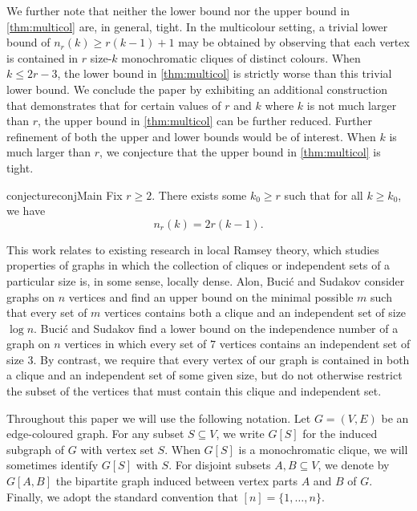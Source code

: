 \documentclass[12pt,a4paper]{article}
\begin{document}
We further note that neither the lower bound nor the upper bound in \cref{thm:multicol} are, in general, tight. In the multicolour setting, a trivial lower bound of $n_r(k) \geq r(k-1)+1$ may be obtained by observing that each vertex is contained in $r$ size-$k$ monochromatic cliques of distinct colours. When $k \leq 2r-3$, the lower bound in \cref{thm:multicol} is strictly worse than this trivial lower bound. We conclude the paper by exhibiting an additional construction that demonstrates that for certain values of $r$ and $k$ where $k$ is not much larger than $r$, the upper bound in \cref{thm:multicol} can be further reduced. Further refinement of both the upper and lower bounds would be of interest. When $k$ is much larger than $r$, we conjecture that the upper bound in \cref{thm:multicol} is tight.

\begin{restatable}{conjecture}{conjMain} \label{conj:main}
    Fix $r \geq 2$. There exists some $k_0 \geq r$ such that for all $k \geq k_0$, we have \begin{equation*}
        n_r(k) = 2r(k-1).
    \end{equation*}
\end{restatable}

This work relates to existing research in local Ramsey theory, which studies properties of graphs in which the collection of cliques or independent sets of a particular size is, in some sense, locally dense. Alon, Buci{\'c} and Sudakov \cite{alon2021large} consider graphs on $n$ vertices and find an upper bound on the minimal possible $m$ such that every set of $m$ vertices contains both a clique and an independent set of size $\log n$. Buci{\'c} and Sudakov \cite{bucic2023large} find a lower bound on the independence number of a graph on $n$ vertices in which every set of $7$ vertices contains an independent set of size $3$. By contrast, we require that every vertex of our graph is contained in both a clique and an independent set of some given size, but do not otherwise restrict the subset of the vertices that must contain this clique and independent set.

Throughout this paper we will use the following notation. Let $G = (V, E)$ be an edge-coloured graph. For any subset $S \subseteq V$, we write $G[S]$ for the induced subgraph of $G$ with vertex set $S$. When $G[S]$ is a monochromatic clique, we will sometimes identify $G[S]$ with $S$. For disjoint subsets $A,B \subseteq V$, we denote by $G[A,B]$ the bipartite graph induced between vertex parts $A$ and $B$ of $G$. Finally, we adopt the standard convention that $[n] = \{1,\dots,n\}$.
\end{document}
